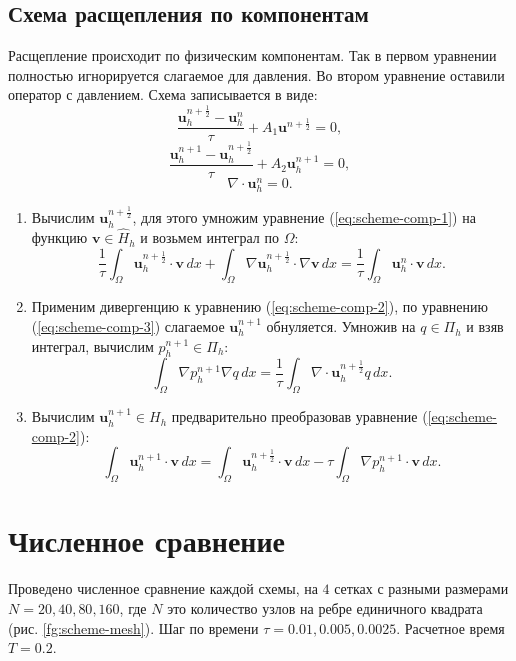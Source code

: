 \documentclass[12pt]{article}
\begin{document}
\subsection{Схема расщепления по компонентам} 
Расщепление происходит по физическим компонентам. Так в первом уравнении полностью игнорируется слагаемое для давления. Во втором уравнение оставили оператор с давлением. Схема записывается в виде:
\begin{equation} \label{eq:scheme-comp-1}
\frac{{\bm u}_h^{n+\frac{1}{2}}-{\bm u}_h^n}{\tau} + A_1 {\bm u}^{n+\frac{1}{2}}=0,
\end{equation} 
\begin{equation} \label{eq:scheme-comp-2}
\frac{{\bm u}_h^{n+1}-{\bm u}_h^{n+\frac{1}{2}}}{\tau} + A_2 {\bm u}_h^{n+1}=0,
\end{equation}
\begin{equation} \label{eq:scheme-comp-3}
\nabla \cdot {\bm u}_h^n = 0.
\end{equation}
\begin{enumerate}
\item 
Вычислим ${\bm u}_h^{n+\frac{1}{2}}$, для этого умножим уравнение (\ref{eq:scheme-comp-1}) на функцию ${\bm v} \in \hat H_h$ и возьмем интеграл по $\Omega$:
$$
\frac{1}{\tau}\int_{\Omega} {\bm u}_h^{n+\frac{1}{2}}\cdot {\bm v} \,dx + \int_{\Omega} \nabla {\bm u}_h^{n+\frac{1}{2}} \cdot \nabla {\bm v} \,dx = \frac{1}{\tau} \int_{\Omega} {\bm u}_h^{n} \cdot {\bm v} \,dx.
$$
\item 
Применим дивергенцию к уравнению (\ref{eq:scheme-comp-2}), по уравнению (\ref{eq:scheme-comp-3}) слагаемое ${\bm u}_h^{n+1}$ обнуляется. Умножив на $q \in \Pi_h$ и взяв интеграл, вычислим $p_h^{n+1} \in \Pi_h$:
$$
\int_{\Omega} \nabla p_h^{n+1} \nabla q \,dx = \frac{1}{\tau} \int_{\Omega} \nabla \cdot {\bm u}_h^{n+\frac{1}{2}} q \,dx.
$$
\item 
Вычислим ${\bm u}_h^{n+1} \in H_h$ предварительно преобразовав уравнение (\ref{eq:scheme-comp-2}):
$$
\int_{\Omega} {\bm u}_h^{n+1} \cdot {\bm v}\,dx = \int_{\Omega} {\bm u}_h^{n+\frac{1}{2}} \cdot {\bm v} \, dx - \tau \int_{\Omega} \nabla p_h^{n+1} \cdot {\bm v} \,dx.
$$
\end{enumerate}

\section{Численное сравнение}
Проведено численное сравнение каждой схемы, на $4$ сетках  с разными размерами $N = 20, 40, 80, 160$, где $N$ это количество узлов на ребре единичного квадрата (рис. \ref{fg:scheme-mesh}). Шаг по времени $\tau = 0.01, 0.005, 0.0025$. Расчетное время $T=0.2$.
\end{document}
